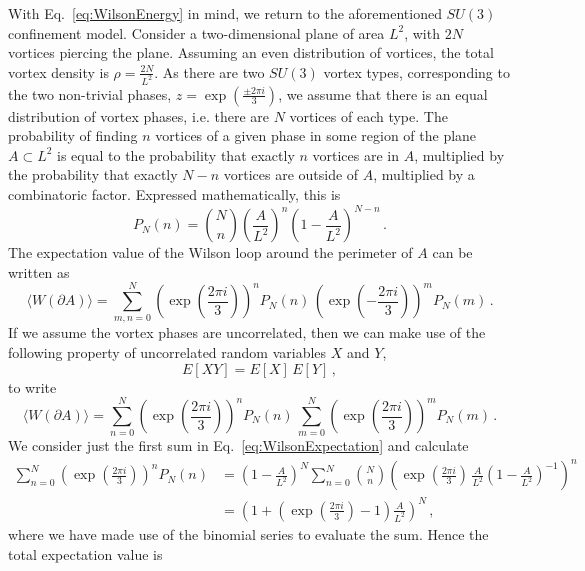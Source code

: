 With Eq.~\ref{eq:WilsonEnergy} in mind, we return to the aforementioned $SU(3)$ confinement model. Consider a two-dimensional plane of area $L^2$, with $2N$ vortices piercing the plane. Assuming an even distribution of vortices, the total vortex density is $\rho = \frac{2N}{L^2}$. As there are two $SU(3)$ vortex types, corresponding to the two non-trivial phases, $z=\exp\left(\frac{\pm 2\pi i}{3}\right)$, we assume that there is an equal distribution of vortex phases, i.e. there are $N$ vortices of each type. The probability of finding $n$ vortices of a given phase in some region of the plane $A\subset L^2$ is equal to the probability that exactly $n$ vortices are in $A$, multiplied by the probability that exactly $N-n$ vortices are outside of $A$, multiplied by a combinatoric factor. Expressed mathematically, this is
%
\begin{equation}
P_N(n) = {N\choose n} \left(\frac{A}{L^2}\right)^n \left(1-\frac{A}{L^2}\right)^{N-n}\, .
\end{equation}
%
The expectation value of the Wilson loop around the perimeter of $A$ can be written as
%
\begin{equation}
\langle W(\partial A)\rangle = \sum_{m,n = 0}^N \left(\exp\left(\frac{2\pi i}{3}\right)\right)^n P_N(n)\, \left(\exp\left(-\frac{2\pi i}{3}\right)\right)^m P_N(m)\, .
\end{equation}
%
If we assume the vortex phases are uncorrelated, then we can make use of the following property of uncorrelated random variables $X$ and $Y$,
%
\begin{equation}
E[XY] = E[X]\, E[Y]\, ,
\end{equation}
%
to write
%
\begin{equation}
\langle W(\partial A)\rangle = \sum_{n=0}^N \left(\exp\left(\frac{2\pi i}{3}\right)\right)^n P_N(n)\,\sum_{m=0}^N \left(\exp\left(\frac{2\pi i}{3}\right)\right)^m P_N(m)\, .
\label{eq:WilsonExpectation}
\end{equation}
%
We consider just the first sum in Eq.~\ref{eq:WilsonExpectation} and calculate
%
\begin{align*}
\sum_{n=0}^N \left(\exp\left(\frac{2\pi i}{3}\right)\right)^n P_N(n) & = \left(1-\frac{A}{L^2}\right)^{N}\sum_{n=0}^{N} {N\choose n} \left(\exp\left(\frac{2\pi i}{3}\right)\,\frac{A}{L^2}\left(1-\frac{A}{L^2}\right)^{-1}\right)^n\\
&=\left(1+\left(\exp\left(\frac{2\pi i}{3}\right) - 1\right)\frac{A}{L^2}\right)^N\, ,
\end{align*}
%
where we have made use of the binomial series to evaluate the sum. Hence the total expectation value is
